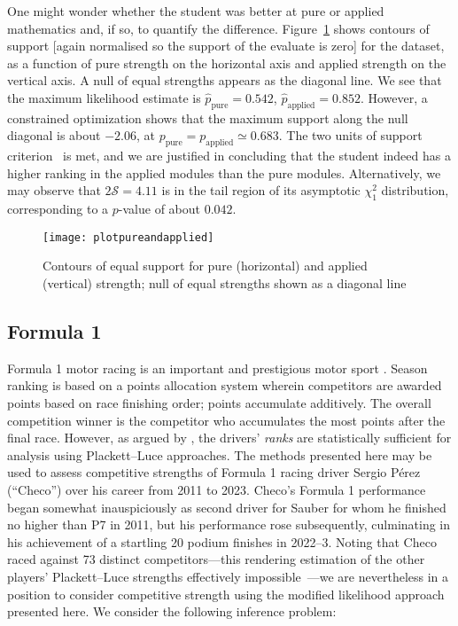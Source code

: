 \documentclass[article]{ajs}
\begin{document}
One might wonder whether the student was better at pure or applied
mathematics and, if so, to quantify the difference.
Figure~\ref{plotpureandapplied} shows contours of support [again
  normalised so the support of the evaluate is zero] for the dataset,
as a function of pure strength on the horizontal axis and applied
strength on the vertical axis.  A null of equal strengths appears as
the diagonal line.  We see that the maximum likelihood estimate is
$\hat{p}_\mathrm{pure}=0.542$, $\hat{p}_\mathrm{applied}=0.852$.
However, a constrained optimization shows that the maximum support
along the null diagonal is about $-2.06$, at
${p}_\mathrm{pure}={p}_\mathrm{applied}\simeq 0.683$.  The two units
of support criterion~\citep{edwards1992} is met, and we are justified
in concluding that the student indeed has a higher ranking in the
applied modules than the pure modules.  Alternatively, we may observe
that $2\mathcal{S}=4.11$ is in the tail region of its asymptotic
$\chi^2_1$ distribution, corresponding to a $p$-value of about
$0.042$.

\begin{figure}
\begin{centering}
\texttt{[image: plotpureandapplied]}  %
\caption{Contours of equal support for pure (horizontal) and applied
  (vertical) strength; null of equal strengths shown as a diagonal
  line \label{plotpureandapplied}}
\end{centering}
\end{figure}


\subsection{Formula 1}

Formula 1 motor racing is an important and prestigious motor sport
\citep{codling2017,jenkins2010}.  Season ranking is based on a points
allocation system wherein competitors are awarded points based on race
finishing order; points accumulate additively.  The overall
competition winner is the competitor who accumulates the most points
after the final race.  However, as argued by
\cite{hankin2023_formula1points}, the drivers' {\em ranks} are
statistically sufficient for analysis using Plackett--Luce approaches.
The methods presented here may be used to assess competitive strengths
of Formula 1 racing driver Sergio P\'{e}rez (``Checo'') over his
career from 2011 to 2023.  Checo's Formula 1 performance began
somewhat inauspiciously as second driver for Sauber for whom he
finished no higher than P7 in 2011, but his performance rose
subsequently, culminating in his achievement of a startling 20 podium
finishes in 2022--3.  Noting that Checo raced against 73 distinct
competitors---this rendering estimation of the other players'
Plackett--Luce strengths effectively
impossible~\citep{hankin2020}---we are nevertheless in a position to
consider competitive strength using the modified likelihood approach
presented here.  We consider the following inference problem:
\end{document}
